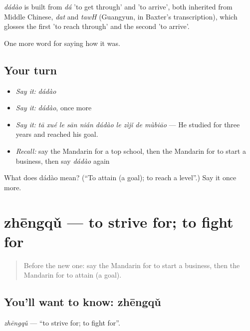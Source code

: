 \begin{cousinweb}
\emph{dádào} is built from \emph{dá} 'to get through' and  'to arrive', both inherited from Middle Chinese, \emph{dat} and \emph{tawH} (Guangyun, in Baxter's transcription), which glosses the first 'to reach through' and the second 'to arrive'.
\end{cousinweb}

\begin{grammarlens}[title={What you've built}]
One more word for saying how it was.
\end{grammarlens}

\subsection*{Your turn}
\begin{itemize}
\raggedright
  \item \emph{Say it:} \emph{dádào}
  \item \emph{Say it:} \emph{dádào}, once more
  \item \emph{Say it:} \emph{tā xué le sān nián dádào le zìjǐ de mùbiāo} — He studied for three years and reached his goal.
  \item \emph{Recall:} say the Mandarin for a top school, then the Mandarin for to start a business, then say \emph{dádào} again
\end{itemize}

\begin{tcolorbox}[breakable,colback=teal!4,colframe=teal!35!black,title={Before you move on}]
What does dádào mean? (\textquotedblleft{}To attain (a goal); to reach a level\textquotedblright{}.) Say it once more.
\end{tcolorbox}
\section[zhēngqǔ]{zhēngqǔ — to strive for; to fight for}

\label{lesson:ZH-C513-zhengqu}



\begin{quote}
Before the new one: say the Mandarin for to start a business, then the Mandarin for to attain (a goal).
\end{quote}

\subsection*{You'll want to know: zhēngqǔ}
\emph{zhēngqǔ} — \textquotedblleft{}to strive for; to fight for\textquotedblright{}.

